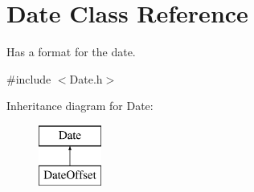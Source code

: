 \hypertarget{class_date}{}\section{Date Class Reference}
\label{class_date}


Has a format for the date.  




{\ttfamily \#include $<$Date.\+h$>$}

Inheritance diagram for Date\+:\begin{figure}[H]
\begin{center}
\leavevmode
\includegraphics[height=2.000000cm]{class_date}
\end{center}
\end{figure}
